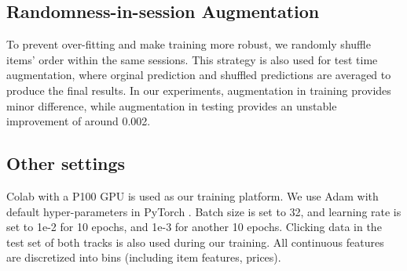 \subsection{Randomness-in-session Augmentation}
To prevent over-fitting and make training more robust, we randomly shuffle items' order within the same sessions. 
This strategy is also used for test time augmentation, where orginal prediction and shuffled predictions are averaged to produce the final results.
In our experiments, augmentation in training provides minor difference, while augmentation in testing provides an unstable improvement of around 0.002.



\subsection{Other settings}
Colab with a P100 GPU is used as our training platform.
We use Adam \cite{adam} with default hyper-parameters in PyTorch \cite {pytorch}.
Batch size is set to 32, and learning rate is set to 1e-2 for 10 epochs, and 1e-3 for another 10 epochs.
%
Clicking data in the test set of both tracks is also used during our training. 
%
All continuous features are discretized into bins (including item features, prices).


